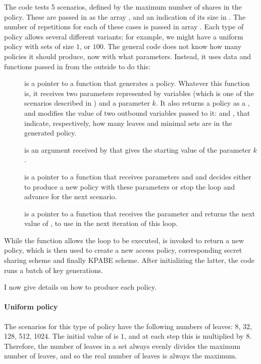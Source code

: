\documentclass{article}
\begin{document}
The code tests 5 scenarios, defined by the maximum number of shares in the policy. These are passed in as the array , and an indication of its size in . The number of repetitions for each of these cases is passed in array . Each type of policy allows several different variants: for example, we might have a uniform policy with sets of size $1$, or $100$. The general code does not know how many policies it should produce, now with what parameters. Instead, it uses data and functions passed in from the outside to do this:
\begin{description}
\item[] is a  pointer to a function that generates a policy. Whatever this function is, it receives two parameters represented by variables  (which is one of the scenarios described in ) and a parameter $k$. It also returns a policy as a , and modifies the value of two outbound variables passed to it:  and , that indicate, respectively, how many leaves and minimal sets are in the generated policy.
\item[] is an argument received by  that gives the starting value of the parameter $k$.
\item[] is a pointer to a function that receives parameters  and  and decides either to produce a new policy with these parameters or stop the loop and advance for the next scenario.
\item[] is a pointer to a function that receives the parameter  and returns the next value of , to use in the next iteration of this loop.
\end{description}

While the function  allows the  loop to be executed,  is invoked to return a new policy, which is then used to create a new access policy, corresponding secret sharing scheme and finally KPABE scheme. After initializing the latter, the code runs a batch of key generations.

I now give details on how to produce each policy.

\paragraph{Uniform policy}
The scenarios for this type of policy have the following numbers of leaves: 8, 32, 128, 512, 1024. 
The initial value of  is $1$, and at each step this is multiplied by $8$. Therefore, the number of leaves in a set always evenly divides the maximum number of leaves, and so the real number of leaves is always the maximum.
\end{document}
